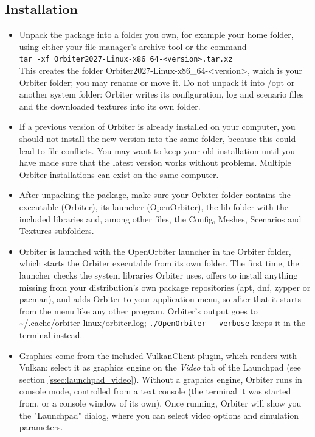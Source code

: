 \documentclass[Orbiter User Manual.tex]{subfiles}
\begin{document}
\subsection{Installation}
\begin{itemize}
\item Unpack the package into a folder you own, for example your home folder, using either your file manager's archive tool or the command\\
\texttt{tar -xf Orbiter2027-Linux-x86\_64-<version>.tar.xz}\\
This creates the folder Orbiter2027-Linux-x86\_64-<version>, which is your Orbiter folder; you may rename or move it. Do not unpack it into /opt or another system folder: Orbiter writes its configuration, log and scenario files and the downloaded textures into its own folder.
\item If a previous version of Orbiter is already installed on your computer, you should not install the new version into the same folder, because this could lead to file conflicts. You may want to keep your old installation until you have made sure that the latest version works without problems. Multiple Orbiter installations can exist on the same computer.
\item After unpacking the package, make sure your Orbiter folder contains the executable (Orbiter), its launcher (OpenOrbiter), the lib folder with the included libraries and, among other files, the Config, Meshes, Scenarios and Textures subfolders.
\item Orbiter is launched with the OpenOrbiter launcher in the Orbiter folder, which starts the Orbiter executable from its own folder. The first time, the launcher checks the system libraries Orbiter uses, offers to install anything missing from your distribution's own package repositories (apt, dnf, zypper or pacman), and adds Orbiter to your application menu, so after that it starts from the menu like any other program. Orbiter's output goes to \textasciitilde/.cache/orbiter-linux/orbiter.log; \texttt{./OpenOrbiter -{}-verbose} keeps it in the terminal instead.
\item Graphics come from the included VulkanClient plugin, which renders with Vulkan: select it as graphics engine on the \textit{Video} tab of the Launchpad (see section \ref{ssec:launchpad_video}). Without a graphics engine, Orbiter runs in console mode, controlled from a text console (the terminal it was started from, or a console window of its own). Once running, Orbiter will show you the "Launchpad" dialog, where you can select video options and simulation parameters.

\end{itemize}
\end{document}
